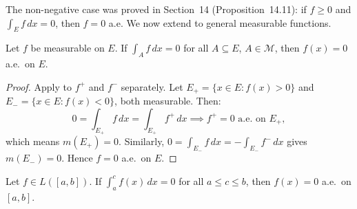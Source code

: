 \documentclass[11pt]{report}
\begin{document}
The non-negative case was proved in Section~14 (Proposition~14.11): if $f \geq 0$ and $\int_E f\,dx = 0$, then $f = 0$ a.e. We now extend to general measurable functions.

\begin{propbox}
Let $f$ be measurable on $E$. If $\int_A f\,dx = 0$ for all $A \subseteq E$, $A \in \mathcal{M}$, then $f(x) = 0$ a.e.\ on $E$.
\end{propbox}

\begin{proof}
Apply to $f^+$ and $f^-$ separately. Let $E_+ = \{x \in E : f(x) > 0\}$ and $E_- = \{x \in E : f(x) < 0\}$, both measurable. Then:
\[
0 = \int_{E_+} f\,dx = \int_{E_+} f^+\,dx \implies f^+ = 0 \text{ a.e.\ on } E_+,
\]
which means $m(E_+) = 0$. Similarly, $0 = \int_{E_-} f\,dx = -\int_{E_-} f^-\,dx$ gives $m(E_-) = 0$. Hence $f = 0$ a.e.\ on $E$.
\end{proof}

\begin{exbox}
Let $f \in L([a,b])$. If $\int_a^c f(x)\,dx = 0$ for all $a \leq c \leq b$, then $f(x) = 0$ a.e.\ on $[a,b]$.
\end{exbox}
\end{document}
